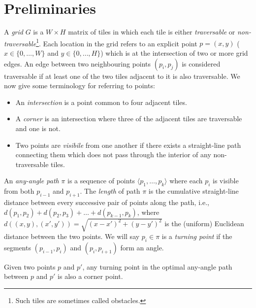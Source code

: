 \section{Preliminaries}
A \emph{grid} $G$ is a $W \times H$ matrix of tiles in which each tile is either
\emph{traversable} or \emph{non-traversable}\footnote{Such tiles are sometimes
called obstacles.}.
Each location in the grid refers to an explicit point $p = (x, y)$
($x \in \{0,\dots,W\}$ and $y \in \{0,\dots,H\}$)
which is at the intersection of two or more grid edges. 
An edge between two neighbouring points $(p_i, p_j)$ 
is considered traversable if at least one of the two tiles adjacent to it is also 
traversable.
We now give some terminology for referring to points:
\begin{itemize}
\item An \emph{intersection} is a point common to four adjacent tiles.
\item A \emph{corner} is an intersection where three of the adjacent tiles are traversable
and one is not.
\item Two points are \emph{visibile} from one another if there exists a 
straight-line path connecting them which does not pass through the interior of any
 non-traversable tiles.
\end{itemize}


An \emph{any-angle path} $\pi$ is a sequence of points 
$\langle p_1,\dots,p_k \rangle$ where each $p_{i}$ is visible from both $p_{i-1}$
and $p_{i+1}$.
The \emph{length} of path $\pi$ 
is the cumulative straight-line distance between every successive
pair of points along the path, 
i.e., $d(p_1,p_2) + d(p_2,p_3) + \dots + d(p_{k-1},p_k)$, 
where $d((x,y), (x',y'))= \sqrt{(x-x')^2 + (y-y')^2}$ 
is the (uniform) Euclidean distance between the two points.  
We will say $p_i \in \pi$ is a \emph{turning point} if the segments
$(p_{i-1}, p_i)$ and $(p_i, p_{i+1})$ form an angle.
\\
\begin{lemm}
\label{lemma::corner}
  Given two points $p$ and $p'$, 
  any turning point in the optimal any-angle path between $p$ and $p'$ 
  is also a corner point.
\end{lemm}

